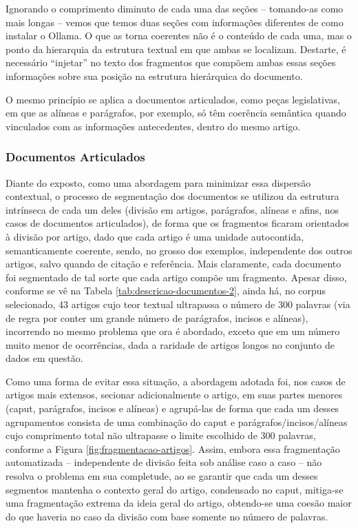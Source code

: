 Ignorando o comprimento diminuto de cada uma das seções -- tomando-as como mais longas -- vemos que temos duas seções com informações diferentes de como instalar o Ollama. O que as torna coerentes não é o conteúdo de cada uma, mas o ponto da hierarquia da estrutura textual em que ambas se localizam. Destarte, é necessário ``injetar'' no texto dos fragmentos que compõem ambas essas seções informações sobre sua posição na estrutura hierárquica do documento.

O mesmo princípio se aplica a documentos articulados, como peças legislativas, em que as alíneas e parágrafos, por exemplo, só têm coerência semântica quando vinculados com as informações antecedentes, dentro do mesmo artigo.

\subsubsection{Documentos Articulados}
\label{subsubsec:Metodologia.1.1.3}

Diante do exposto, como uma abordagem para minimizar essa dispersão contextual, o processo de segmentação dos documentos se utilizou da estrutura intrínseca de cada um deles (divisão em artigos, parágrafos, alíneas e afins, nos casos de documentos articulados), de forma que os fragmentos ficaram orientados à divisão por artigo, dado que cada artigo é uma unidade autocontida, semanticamente coerente, sendo, no grosso dos exemplos, independente dos outros artigos, salvo quando de citação e referência. Mais claramente, cada documento foi segmentado de tal sorte que cada artigo compõe um fragmento. Apesar disso, conforme se vê na Tabela \ref{tab:descricao-documentos-2}, ainda há, no corpus selecionado, 43 artigos cujo teor textual ultrapassa o número de 300 palavras (via de regra por conter um grande número de parágrafos, incisos e alíneas), incorrendo no mesmo problema que ora é abordado, exceto que em um número muito menor de ocorrências, dada a raridade de artigos longos no conjunto de dados em questão.

Como uma forma de evitar essa situação, a abordagem adotada foi, nos casos de artigos mais extensos, secionar adicionalmente o artigo, em suas partes menores (caput, parágrafos, incisos e alíneas) e agrupá-las de forma que cada um desses agrupamentos consista de uma combinação do caput e parágrafos/incisos/alíneas cujo comprimento total não ultrapasse o limite escolhido de 300 palavras, conforme a Figura \ref{fig:fragmentacao-artigos}. Assim, embora essa fragmentação automatizada -- independente de divisão feita sob análise caso a caso -- não resolva o problema em sua completude, ao se garantir que cada um desses segmentos mantenha o contexto geral do artigo, condensado no caput, mitiga-se uma fragmentação extrema da ideia geral do artigo, obtendo-se uma coesão maior do que haveria no caso da divisão com base somente no número de palavras.

